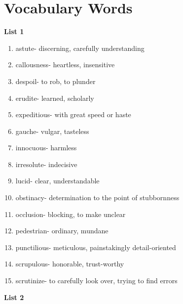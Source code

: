 \section{Vocabulary Words}

\textbf{List 1}

\begin{enumerate}

\item astute- discerning, carefully understanding

\item callousness- heartless, insensitive

\item despoil- to rob, to plunder

\item erudite- learned, scholarly 

\item expeditious- with great speed or haste

\item gauche- vulgar, tasteless

\item innocuous- harmless

\item irresolute- indecisive

\item lucid- clear, understandable

\item obstinacy- determination to the point of stubbornness 

\item occlusion- blocking, to make unclear

\item pedestrian- ordinary, mundane

\item punctilious- meticulous, painstakingly detail-oriented

\item scrupulous- honorable, trust-worthy

\item scrutinize- to carefully look over, trying to find errors

\end{enumerate}

\textbf{List 2}

